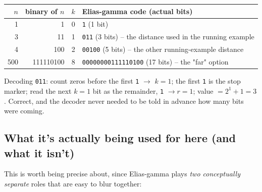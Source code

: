 \documentclass[11pt]{article}
\begin{document}
\begin{tcolorbox}[colback=green!5!white,colframe=green!45!black,title=Worked example: the actual bits for values from our running example]
\begin{center}
\begin{tabular}{@{}rrrl@{}}
\toprule
$n$ & binary of $n$ & $k$ & Elias-gamma code (actual bits) \\
\midrule
1 & 1 & 0 & \texttt{1} (1 bit) \\
3 & 11 & 1 & \texttt{011} (3 bits) -- the distance used in the running example \\
4 & 100 & 2 & \texttt{00100} (5 bits) -- the other running-example distance \\
500 & 111110100 & 8 & \texttt{00000000111110100} (17 bits) -- the "far" option \\
\bottomrule
\end{tabular}
\end{center}
Decoding \texttt{011}: count zeros before the first \texttt{1} $\to$ $k{=}1$; the first
\texttt{1} is the stop marker; read the next $k{=}1$ bit as the remainder, \texttt{1}
$\to r{=}1$; value $= 2^1 + 1 = 3$. Correct, and the decoder never needed to be told in
advance how many bits were coming.
\end{tcolorbox}

\subsection{What it's actually being used for here (and what it isn't)}
\label{sec:eliasgamma-purpose}

This is worth being precise about, since Elias-gamma plays \emph{two conceptually
separate} roles that are easy to blur together:
\end{document}
